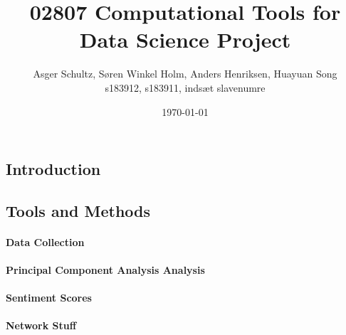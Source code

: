 \documentclass[12pt,fleqn]{article}
\title{\vspace*{-3cm}02807 Computational Tools for Data Science Project}
\author{Asger Schultz, Søren Winkel Holm, Anders Henriksen, Huayuan Song\\
s183912, s183911, indsæt slavenumre}
\date{\today}
\begin{document}
\maketitle

\subsection*{Introduction}

\subsection*{Tools and Methods}

\paragraph{Data Collection}

\paragraph{Principal Component Analysis Analysis}

\paragraph{Sentiment Scores}

\paragraph{Network Stuff}
\end{document}
